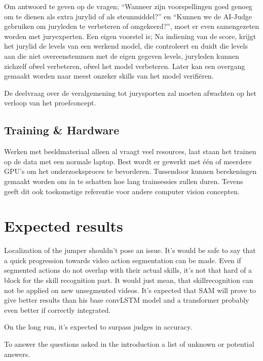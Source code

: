 
Om antwoord te geven op de vragen; ``Wanneer zijn voorspellingen goed genoeg om te dienen als extra jurylid of als steunmiddel?'' en ``Kunnen we de AI-Judge gebruiken om juryleden te verbeteren of omgekeerd?'', moet er even samengezeten worden met juryexperten.
Een eigen voorstel is; Na indiening van de score, krijgt het jurylid de levels van een werkend model, die controleert en duidt die levels aan die niet overeenstemmen met de eigen gegeven levels, juryleden kunnen zichzelf ofwel verbeteren, ofwel het model verbeteren. Later kan een overgang gemaakt worden naar meest onzeker skills van het model verifiëren.

De deelvraag over de veralgemening tot jurysporten zal moeten afwachten op het verloop van het proefconcept.

\subsection{Training \& Hardware}

Werken met beeldmateriaal alleen al vraagt veel resources, laat staan het trainen op de data met een normale laptop. Best wordt er gewerkt met één of meerdere GPU's om het onderzoeksproces te bevorderen. Tussendoor kunnen berekeningen gemaakt worden om in te schatten hoe lang trainsessies zullen duren. Tevens geeft dit ook toekomstige referentie voor andere computer vision concepten.


\section{Expected results}
\label{sec:verwachte-resultaten}

Localization of the jumper shouldn't pose an issue. It's would be safe to say that a quick progression towards video action segmentation can be made. Even if segmented actions do not overlap with their actual skills, it's not that hard of a block for the skill recognition part. It would just mean, that skillrecognition can not be applied on new unsegmented videos.
It's expected that SAM will prove to give better results than his base convLSTM model and a transformer probably even better if correctly integrated.

On the long run, it's expected to surpass judges in accuracy.

To answer the questions asked in the introduction a list of unknown or potential answers.

